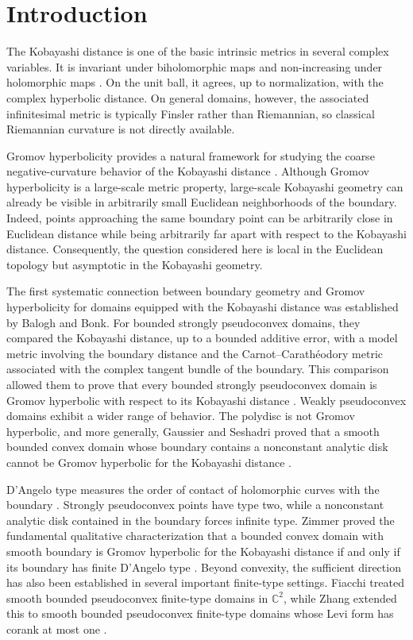 \documentclass[11pt]{article}
\theoremstyle{definition}
\newcommand{\C}{\mathbb{C}}
\begin{document}
\section{Introduction}\label{sec:introduction}

The Kobayashi distance is one of the basic intrinsic metrics in several
complex variables.  It is invariant under biholomorphic maps and
non-increasing under holomorphic maps \cite{Kobayashi}.  On the unit ball,
it agrees, up to normalization, with the complex hyperbolic distance.
On general domains, however, the associated infinitesimal metric is
typically Finsler rather than Riemannian, so classical Riemannian
curvature is not directly available.

Gromov hyperbolicity provides a natural framework for studying the
coarse negative-curvature behavior of the Kobayashi distance
\cite{Gromov,BridsonHaefliger}. Although Gromov hyperbolicity is a
large-scale metric property, large-scale Kobayashi geometry can already
be visible in arbitrarily small Euclidean neighborhoods of the boundary.
Indeed, points approaching the same boundary point can be arbitrarily
close in Euclidean distance while being arbitrarily far apart with
respect to the Kobayashi distance. Consequently, the question considered
here is local in the Euclidean topology but asymptotic in the Kobayashi
geometry.

The first systematic connection between boundary geometry and Gromov
hyperbolicity for domains equipped with the Kobayashi distance was
established by Balogh and Bonk. For bounded strongly pseudoconvex
domains, they compared the Kobayashi distance, up to a bounded additive
error, with a model metric involving the boundary distance and the
Carnot--Carath\'eodory metric associated with the complex tangent
bundle of the boundary. This comparison allowed them to prove that
every bounded strongly pseudoconvex domain is Gromov hyperbolic with
respect to its Kobayashi distance \cite{BaloghBonk}.  Weakly pseudoconvex domains exhibit a wider range
of behavior.  The polydisc is not Gromov hyperbolic, and more generally,
Gaussier and Seshadri proved that a smooth bounded convex domain whose
boundary contains a nonconstant analytic disk cannot be Gromov
hyperbolic for the Kobayashi distance
\cite{GaussierSeshadri}.

D'Angelo type measures the order of contact of holomorphic curves with
the boundary \cite{DAngelo}.  Strongly pseudoconvex points have type
two, while a nonconstant analytic disk contained in the boundary
forces infinite type.  Zimmer proved the fundamental qualitative
characterization that a bounded convex domain with smooth boundary is
Gromov hyperbolic for the Kobayashi distance if and only if its
boundary has finite D'Angelo type \cite{ZimmerFiniteType}.  Beyond
convexity, the sufficient direction has also been established in
several important finite-type settings.  Fiacchi treated smooth bounded
pseudoconvex finite-type domains in \(\C^2\), while Zhang extended this
to smooth bounded pseudoconvex finite-type domains whose Levi form has
corank at most one \cite{Fiacchi,ZhangLeviCorankOne}.
\end{document}
